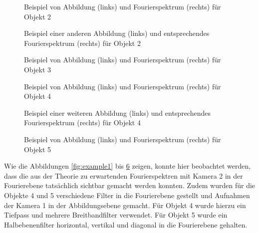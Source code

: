 \begin{figure}[h]
	\centering
	\caption{Beispiel von Abbildung (links) und Fourierspektrum (rechts) für Objekt 2}
	\label{fig:example2}
\end{figure}

\begin{figure}[h]
	\centering
	\caption{Beispiel einer anderen Abbildung (links) und entsprechendes Fourierspektrum (rechts) für Objekt 2}
	\label{fig:example3}
\end{figure}

\begin{figure}[h]
	\centering
	\caption{Beispiel von Abbildung (links) und Fourierspektrum (rechts) für Objekt 3}
	\label{fig:example13}
\end{figure}

\begin{figure}[h]
	\centering
	\caption{Beispiel von Abbildung (links) und Fourierspektrum (rechts) für Objekt 4}
	\label{fig:example4}
\end{figure}

\begin{figure}[h]
	\centering
	\caption{Beispiel einer weiteren Abbildung (links) und entsprechendes Fourierspektrum (rechts) für Objekt 4}
	\label{fig:example9}
\end{figure}

\begin{figure}[h]
	\centering
	\caption{Beispiel von Abbildung (links) und Fourierspektrum (rechts) für Objekt 5}
	\label{fig:example16}
\end{figure}


\clearpage\newpage %
Wie die Abbildungen \ref{fig:example1} bis \ref{fig:example16} zeigen, konnte hier beobachtet werden, dass die aus der Theorie zu erwartenden Fourierspektren mit Kamera 2 in der Fourierebene tatsächlich sichtbar gemacht werden konnten. 
Zudem wurden für die Objekte 4 und 5 verschiedene Filter in die Fourierebene gestellt und Aufnahmen der Kamera 1 in der Abbildungsebene gemacht. Für Objekt 4 wurde hierzu ein Tiefpass und mehrere Breitbandfilter verwendet. Für Objekt 5 wurde ein Halbebenenfilter horizontal, vertikal und diagonal in die Fourierebene gehalten. \\


